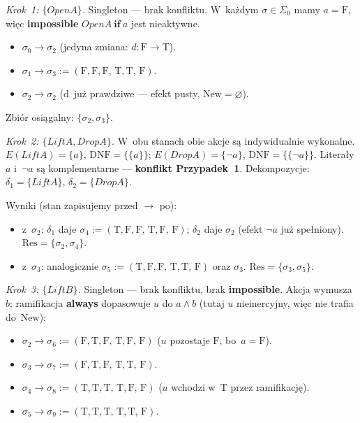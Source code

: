 \documentclass[11pt,a4paper]{article}
\renewcommand{\iff}{\textbf{if}}
\newcommand{\always}{\textbf{always}}
\newcommand{\impossible}{\textbf{impossible}}
\newcommand{\DNF}{\mathrm{DNF}}
\theoremstyle{definition}
\begin{document}
\medskip
\noindent\textit{Krok~1: $\{\mathit{OpenA}\}$.} Singleton --- brak konfliktu.
W~każdym $\sigma \in \Sigma_0$ mamy $a = \text{F}$, więc \impossible{}
$\mathit{OpenA}\ \iff\ a$ jest nieaktywne.
\begin{itemize}[topsep=2pt]
  \item $\sigma_0 \to \sigma_2$ (jedyna zmiana: $d\colon \text{F} \to \text{T}$).
  \item $\sigma_1 \to \sigma_3 := (\text{F},\text{F},\text{F},\,\text{T},\text{T},\,\text{F})$.
  \item $\sigma_2 \to \sigma_2$ (d~już prawdziwe --- efekt pusty, $\mathrm{New} = \varnothing$).
\end{itemize}
Zbiór osiągalny: $\{\sigma_2, \sigma_3\}$.

\medskip
\noindent\textit{Krok~2: $\{\mathit{LiftA}, \mathit{DropA}\}$.}
W~obu stanach obie akcje są indywidualnie wykonalne.
$E(\mathit{LiftA}) = \{a\}$, $\DNF = \{\{a\}\}$;
$E(\mathit{DropA}) = \{\neg a\}$, $\DNF = \{\{\neg a\}\}$.
Literały $a$ i~$\neg a$ są komplementarne --- \textbf{konflikt Przypadek~1}.
Dekompozycje: $\delta_1 = \{\mathit{LiftA}\}$, $\delta_2 = \{\mathit{DropA}\}$.

\smallskip
Wyniki (stan zapisujemy przed $\to$ po):
\begin{itemize}[topsep=2pt]
  \item z~$\sigma_2$: $\delta_1$ daje
        $\sigma_4 := (\text{T},\text{F},\text{F},\,\text{T},\text{F},\,\text{F})$;
        $\delta_2$ daje $\sigma_2$ (efekt $\neg a$ już spełniony).
        $\mathrm{Res} = \{\sigma_2, \sigma_4\}$.
  \item z~$\sigma_3$: analogicznie
        $\sigma_5 := (\text{T},\text{F},\text{F},\,\text{T},\text{T},\,\text{F})$
        oraz $\sigma_3$. $\mathrm{Res} = \{\sigma_3, \sigma_5\}$.
\end{itemize}

\medskip
\noindent\textit{Krok~3: $\{\mathit{LiftB}\}$.} Singleton --- brak konfliktu,
brak \impossible{}. Akcja wymusza $b$; ramifikacja \always{}
dopasowuje $u$ do $a \land b$ (tutaj $u$ nieinercyjny, więc nie trafia do~$\mathrm{New}$):
\begin{itemize}[topsep=2pt]
  \item $\sigma_2 \to \sigma_6 := (\text{F},\text{T},\text{F},\,\text{T},\text{F},\,\text{F})$
        ($u$ pozostaje $\text{F}$, bo~$a = \text{F}$).
  \item $\sigma_3 \to \sigma_7 := (\text{F},\text{T},\text{F},\,\text{T},\text{T},\,\text{F})$.
  \item $\sigma_4 \to \sigma_8 := (\text{T},\text{T},\text{T},\,\text{T},\text{F},\,\text{F})$
        ($u$ wchodzi w~$\text{T}$ przez ramifikację).
  \item $\sigma_5 \to \sigma_9 := (\text{T},\text{T},\text{T},\,\text{T},\text{T},\,\text{F})$.
\end{itemize}
\end{document}
